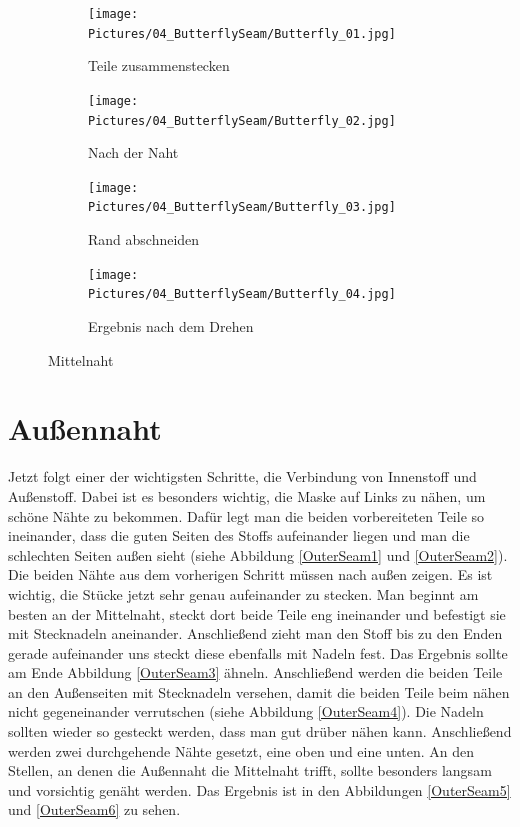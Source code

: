 \documentclass[12pt,parskip=full]{scrartcl}
\begin{document}
\begin{figure}[ht]
    \vspace{0.5cm}
    \centering
    \begin{subfigure}{0.48\textwidth}
        \centering
        \texttt{[image: Pictures/04\_ButterflySeam/Butterfly\_01.jpg]}
        \caption{Teile zusammenstecken}
        \label{Butterfly1}
    \end{subfigure}
    \begin{subfigure}{0.48\textwidth}
        \centering
        \texttt{[image: Pictures/04\_ButterflySeam/Butterfly\_02.jpg]}
        \caption{Nach der Naht}
        \label{Butterfly2}
    \end{subfigure}
    \begin{subfigure}{0.48\textwidth}
        \centering
        \texttt{[image: Pictures/04\_ButterflySeam/Butterfly\_03.jpg]}
        \caption{Rand abschneiden}
        \label{Butterfly3}
    \end{subfigure}
    \begin{subfigure}{0.48\textwidth}
        \centering
        \texttt{[image: Pictures/04\_ButterflySeam/Butterfly\_04.jpg]}
        \caption{Ergebnis nach dem Drehen}
        \label{Butterfly4}
    \end{subfigure}
    \caption{Mittelnaht}
    \label{Butterfly}
\end{figure}

\section{Außennaht}
Jetzt folgt einer der wichtigsten Schritte, die Verbindung von Innenstoff und Außenstoff. Dabei ist es besonders wichtig, die Maske auf Links zu nähen, um schöne Nähte zu bekommen. Dafür legt man die beiden vorbereiteten Teile so ineinander, dass die guten Seiten des Stoffs aufeinander liegen und man die schlechten Seiten außen sieht (siehe Abbildung \ref{OuterSeam1} und \ref{OuterSeam2}). Die beiden Nähte aus dem vorherigen Schritt müssen nach außen zeigen. Es ist wichtig, die Stücke jetzt sehr genau aufeinander zu stecken. Man beginnt am besten an der Mittelnaht, steckt dort beide Teile eng ineinander und befestigt sie mit Stecknadeln aneinander. Anschließend zieht man den Stoff bis zu den Enden gerade aufeinander uns steckt diese ebenfalls mit Nadeln fest. Das Ergebnis sollte am Ende Abbildung \ref{OuterSeam3} ähneln. Anschließend werden die beiden Teile an den Außenseiten mit Stecknadeln versehen, damit die beiden Teile beim nähen nicht gegeneinander verrutschen (siehe Abbildung \ref{OuterSeam4}). Die Nadeln sollten wieder so gesteckt werden, dass man gut drüber nähen kann. Anschließend werden zwei durchgehende Nähte gesetzt, eine oben und eine unten. An den Stellen, an denen die Außennaht die Mittelnaht trifft, sollte besonders langsam und vorsichtig genäht werden. Das Ergebnis ist in den Abbildungen \ref{OuterSeam5} und \ref{OuterSeam6} zu sehen.
\end{document}

